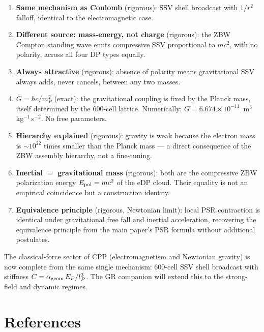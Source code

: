 \documentclass[12pt]{article}
\newcommand{\lP}{l_P}
\newcommand{\EP}{E_P}
\newcommand{\mP}{m_P}
\newcommand{\alphageom}{\alpha_{\rm geom}}
\begin{document}
\begin{enumerate}
  \item \textbf{Same mechanism as Coulomb} (rigorous): SSV shell broadcast
    with $1/r^2$ falloff, identical to the electromagnetic case.

  \item \textbf{Different source: mass-energy, not charge} (rigorous): the
    ZBW Compton standing wave emits compressive SSV proportional to $mc^2$,
    with no polarity, across all four DP types equally.

  \item \textbf{Always attractive} (rigorous): absence of polarity means
    gravitational SSV always adds, never cancels, between any two masses.

  \item \textbf{$G = \hbar c/\mP^2$} (exact): the gravitational coupling is
    fixed by the Planck mass, itself determined by the 600-cell lattice.
    Numerically: $G = 6.674\times10^{-11}$~m$^3$\,kg$^{-1}$\,s$^{-2}$.
    No free parameters.

  \item \textbf{Hierarchy explained} (rigorous): gravity is weak because the
    electron mass is $\sim10^{22}$ times smaller than the Planck mass ---
    a direct consequence of the ZBW assembly hierarchy, not a fine-tuning.

  \item \textbf{Inertial $=$ gravitational mass} (rigorous): both are the
    compressive ZBW polarization energy $E_{\rm pol} = mc^2$ of the eDP
    cloud.  Their equality is not an empirical coincidence but a
    construction identity.

  \item \textbf{Equivalence principle} (rigorous, Newtonian limit): local
    PSR contraction is identical under gravitational free fall and
    inertial acceleration, recovering the equivalence principle from
    the main paper's PSR formula without additional postulates.
\end{enumerate}

The classical-force sector of CPP (electromagnetism and Newtonian gravity)
is now complete from the same single mechanism: 600-cell SSV shell broadcast
with stiffness $C = \alphageom\,\EP/\lP^3$.  The GR companion will extend
this to the strong-field and dynamic regimes.

\section*{References}
\end{document}
